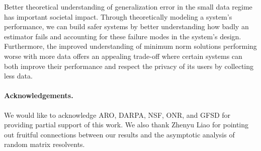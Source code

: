 \documentclass[11pt]{article}
\begin{document}
  Better theoretical understanding of generalization error in the small data
  regime has important societal impact. Through theoretically modeling a system's
  performance, we can build safer systems by better understanding how badly an
  estimator fails and accounting for these failure modes in the system's design.
  Furthermore, the improved understanding of minimum norm solutions performing
  worse with more data offers an appealing trade-off where certain systems can
  both improve their performance and respect the privacy of its users by
  collecting less data.
\fi

\paragraph{Acknowledgements.}
We would like to acknowledge ARO, DARPA, NSF, ONR, and GFSD for providing
partial support of this work. We also thank Zhenyu Liao for pointing
out fruitful connections between our results and the asymptotic
analysis of random matrix resolvents.

\ifisarxiv
  
\else
  
\fi



\ifisarxiv\else\newpage\fi

\appendix


\end{document}
